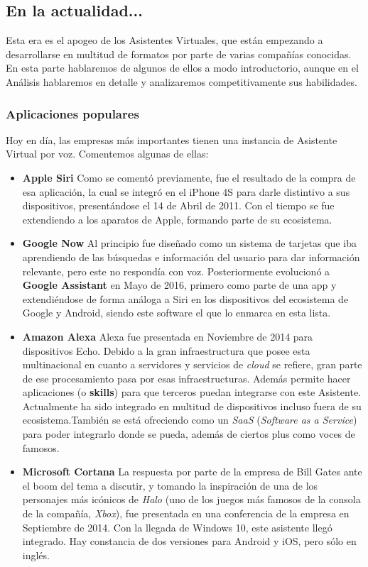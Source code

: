 \subsection{En la actualidad...}
Esta era es el apogeo de los Asistentes Virtuales, que están empezando a desarrollarse en multitud de formatos por parte de varias compañías conocidas. En esta parte hablaremos de algunos de ellos a modo introductorio, aunque en el Análisis hablaremos en detalle y analizaremos competitivamente sus habilidades.

\subsubsection {Aplicaciones populares}
Hoy en día, las empresas más importantes tienen una instancia de Asistente Virtual por voz. Comentemos algunas de ellas:

\begin{itemize}
	\item \textbf{Apple Siri} Como se comentó previamente, fue el resultado de la compra de esa aplicación, la cual se integró en el iPhone 4S para darle distintivo a sus dispositivos, presentándose el 14 de Abril de 2011. Con el tiempo se fue extendiendo a los aparatos de Apple, formando parte de su ecosistema.
	\item \textbf{Google Now} Al principio fue diseñado como un sistema de tarjetas que iba aprendiendo de las búsquedas e información del usuario para dar información relevante, pero este no respondía con voz. Posteriormente evolucionó a \textbf{Google Assistant} en Mayo de 2016, primero como parte de una app y extendiéndose de forma análoga a Siri en los dispositivos del ecosistema de Google y Android, siendo este software el que lo enmarca en esta lista.
	\item \textbf{Amazon Alexa} Alexa fue presentada en Noviembre de 2014 para dispositivos Echo. Debido a la gran infraestructura que posee esta multinacional en cuanto a servidores y servicios de \textit{cloud} se refiere, gran parte de ese procesamiento pasa por esas infraestructuras. Además permite hacer aplicaciones (o \textbf{skills}) para que terceros puedan integrarse con este Asistente. Actualmente ha sido integrado en multitud de dispositivos incluso fuera de su ecosistema.También se está ofreciendo como un \textit{SaaS} (\textit{Software as a Service}) para poder integrarlo donde se pueda, además de ciertos plus como voces de famosos.
	\item \textbf{Microsoft Cortana} La respuesta por parte de la empresa de Bill Gates ante el boom del tema a discutir, y tomando la inspiración de una de los personajes más icónicos de \textit{Halo} (uno de los juegos más famosos de la consola de la compañía, \textit{Xbox}), fue presentada en una conferencia de la empresa en Septiembre de 2014. Con la llegada de Windows 10, este asistente llegó integrado. Hay constancia de dos versiones para Android y iOS, pero sólo en inglés.
\end{itemize}

